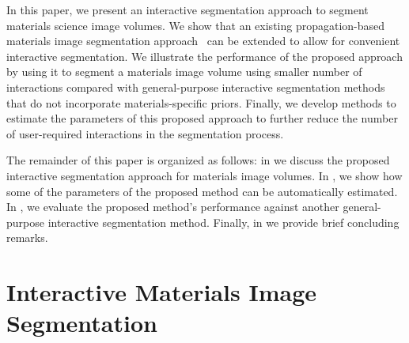 \documentclass[]{spie}  %
\begin{document}
In this paper, we present an interactive segmentation approach to
segment materials science image volumes.  We show that an existing
propagation-based materials image segmentation
approach~\cite{waggoner:11} can be extended to allow for convenient
interactive segmentation.  We illustrate the performance of the
proposed approach by using it to segment a materials image volume
using smaller number of interactions compared with general-purpose
interactive segmentation methods that do not incorporate
materials-specific priors.  Finally, we develop methods to estimate
the parameters of this proposed approach to further reduce the number
of user-required interactions in the segmentation process.

The remainder of this paper is organized as follows: in
 we discuss the proposed interactive segmentation
approach for materials image volumes. In , we show how
some of the parameters of the proposed method can be automatically
estimated.  In , we evaluate the proposed method's
performance against another general-purpose interactive segmentation
method.  Finally, in  we provide brief concluding
remarks.

\section{Interactive Materials Image Segmentation}
\label{sec:interactive}
\end{document}
